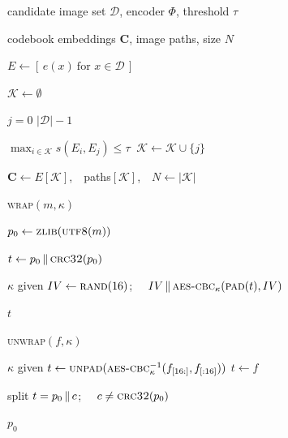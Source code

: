 
\begin{algorithm}[t]
\caption{Codebook construction (pre-processing)}\label{alg:codebook}
\begin{pseudo}
\item {} candidate image set $\mathcal{D}$, encoder $\Phi$, threshold $\tau$
\item {} codebook embeddings $\mathbf{C}$, image paths, size $N$
\item $E \gets [\,e(x)\ \text{for } x\in\mathcal{D}\,]$ 
\item $\mathcal{K}\gets\emptyset$
\item {} $j=0$  $|\mathcal{D}|-1$ 
\item \Ind {} $\max_{i\in\mathcal{K}} s(E_i,E_j)\le\tau$ 
           $\ \mathcal{K}\gets\mathcal{K}\cup\{j\}$ 
\item {}
\item {} $\mathbf{C}\gets E[\mathcal{K}]$,\ \ paths$[\mathcal{K}]$,\ \ $N\gets|\mathcal{K}|$
\end{pseudo}
\end{algorithm}

\begin{algorithm}[t]
\caption{Cryptographic framing (\textsc{wrap} / \textsc{unwrap}, AES-256-CBC)}\label{alg:wrap}
\begin{pseudo}
\item {} \textsc{wrap}$(m,\kappa)$
\item \Ind $p_0 \gets \textsc{zlib}(\textsc{utf8}(m))$ 
\item \Ind $t \gets p_0 \,\Vert\, \textsc{crc32}(p_0)$ 
\item \Ind {} $\kappa$ given  $IV\gets\textsc{rand}(16)$;\ \  $IV \,\Vert\, \textsc{aes-cbc}_\kappa(\textsc{pad}(t),IV)$
\item \Ind {}  $t$ 
\item {} \textsc{unwrap}$(f,\kappa)$
\item \Ind {} $\kappa$ given  $t\gets\textsc{unpad}(\textsc{aes-cbc}^{-1}_\kappa(f_{[16:]},f_{[:16]}))$  $t\gets f$
\item \Ind split $t=p_0\,\Vert\, c$;\ \  $c\neq\textsc{crc32}(p_0)$  
\item \Ind {} $p_0$
\end{pseudo}
\end{algorithm}

